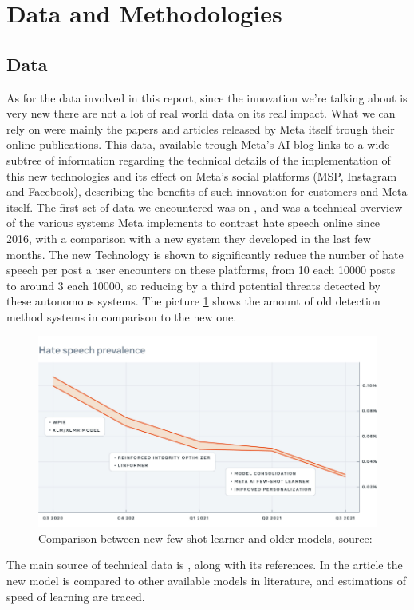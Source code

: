 \section{Data and Methodologies}
\subsection{Data}
As for the data involved in this report, since the innovation we're
talking about is very new there are not a lot of real world data on
its real impact. What we can rely on were mainly the papers and
articles released by Meta itself trough their online
publications. This data, available trough Meta's AI blog
\cite{site:AIart} links to a wide subtree of information regarding the
technical details of the implementation of this new technologies and
its effect on Meta's social platforms (MSP, Instagram and Facebook),
describing the benefits of such innovation for customers and Meta
itself. The first set of data we encountered was on \cite{site:AIart},
and was a technical overview of the various systems Meta implements to
contrast hate speech online since 2016, with a comparison with a new
system they developed in the last few months. The new Technology is
shown to significantly reduce the number of hate speech per post a
user encounters on these platforms, from 10 each 10000 posts to around
3 each 10000, so reducing by a third potential threats detected by
these autonomous systems. The picture \ref{fig:aichart} shows the
amount of old detection method systems in comparison to the new one.

\begin{figure}
  \centering
  \includegraphics[width=.8\textwidth]{images/fsl_chart.png}
  \caption{Comparison between new few shot learner and
    older models, source: \cite{site:AIart}}
  \label{fig:aichart}
\end{figure}

The main source of technical data is \cite{art:entailing}, along with
its references. In the article the new model is compared to other
available models in literature, and estimations of speed of learning
are traced.

